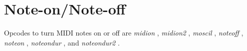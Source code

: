 \begin{comment}
\documentclass[10pt]{article}
\usepackage{fullpage, graphicx, url}
\setlength{\parskip}{1ex}
\setlength{\parindent}{0ex}
\title{Note-on/Note-off}



\begin{tabular}{ccc}
The Alternative Csound Reference Manual & & \\
Previous &MIDI Support &Next

\end{tabular}

\end{comment}
\section{Note-on/Note-off}


  Opcodes to turn MIDI notes on or off are \emph{midion}
, \emph{midion2}
, \emph{moscil}
, \emph{noteoff}
, \emph{noteon}
, \emph{noteondur}
, and \emph{noteondur2}
. 


\begin{comment}
\begin{tabular}{lcr}
Previous &Home &Next \\
Generic Input and Output &Up &MIDI Message Output

\end{tabular}



\end{comment}
